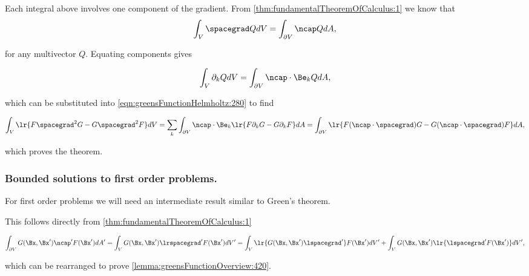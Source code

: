 Each integral above involves one component of the gradient.
From
\cref{thm:fundamentalTheoremOfCalculus:1}
we know that
\begin{dmath}\label{eqn:greensFunctionHelmholtz:300}
\int_V \spacegrad Q dV = \int_{\partial V} \ncap Q dA,
\end{dmath}

for any multivector \( Q \).
Equating components gives

\begin{dmath}\label{eqn:greensFunctionHelmholtz:340}
\int_V \partial_k Q dV = \int_{\partial V} \ncap \cdot \Be_k Q dA,
\end{dmath}

which can be substituted into \cref{eqn:greensFunctionHelmholtz:280} to find

\begin{dmath}\label{eqn:greensFunctionHelmholtz:360}
\int_V \lr{ F \spacegrad^2 G - G \spacegrad^2 F } dV
=
\sum_k \int_{\partial V} \ncap \cdot \Be_k \lr{ F \partial_k G - G \partial_k F } dA
=
\int_{\partial V} \lr{ F (\ncap \cdot \spacegrad) G - G (\ncap \cdot \spacegrad) F } dA,
\end{dmath}

which proves the theorem.

\subsubsection{Bounded solutions to first order problems.}

For first order problems we will need an intermediate result similar to Green's theorem.


This follows directly from \cref{thm:fundamentalTheoremOfCalculus:1}

\begin{dmath}\label{eqn:greensFunctionOverview:440}
\int_{\partial V} G(\Bx, \Bx') \ncap' F(\Bx') dA'
=
\int_V G(\Bx, \Bx') \lrspacegrad' F(\Bx') dV'
=
\int_V \lr{ G(\Bx, \Bx') \lspacegrad' } F(\Bx') dV'
+
\int_V G(\Bx, \Bx') \lr{ \lspacegrad' F(\Bx') } dV',
\end{dmath}

which can be rearranged to prove \cref{lemma:greensFunctionOverview:420}.

